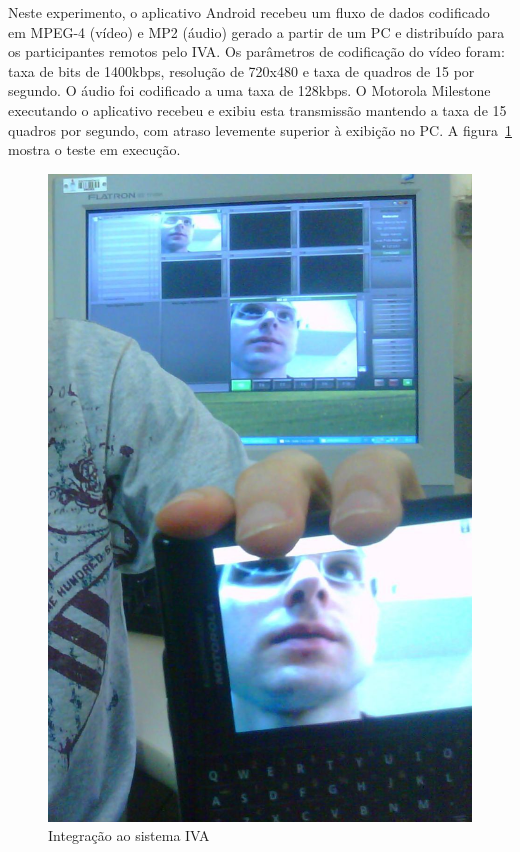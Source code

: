 \documentclass{acm_proc_article-sp}
\begin{document}
Neste experimento, o aplicativo Android recebeu um fluxo de dados codificado em MPEG-4 (vídeo) e MP2 (áudio) gerado a partir de um PC e distribuído para os participantes remotos pelo IVA. Os parâmetros de codificação do vídeo foram: taxa de bits de 1400kbps, resolução de 720x480 e taxa de quadros de 15 por segundo. O áudio foi codificado a uma taxa de 128kbps. O Motorola Milestone executando o aplicativo recebeu e exibiu esta transmissão mantendo a taxa de 15 quadros por segundo, com atraso levemente superior à exibição no PC. A figura~\ref{figura_eadcel} mostra o teste em execução.

\begin{figure}[htp]
 \centering
 \includegraphics[scale=0.15]{./ivamobile.jpg}
\caption{Integração ao sistema IVA}\label{figura_eadcel}
\end{figure}
\end{document}
